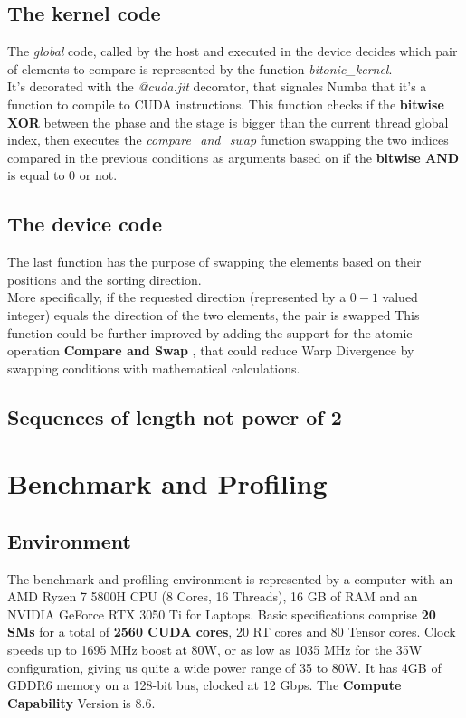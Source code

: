 \documentclass[a4paper, 12pt, oneside]{article}
\begin{document}
\subsection{The kernel code}
The \textit{global} code, called by the host and executed in the device decides which pair of elements to compare is represented by the function \textit{bitonic\_kernel}.\\
It's decorated with the \textit{@cuda.jit} decorator, that signales Numba that it's a function to compile to CUDA instructions.
This function checks if the \textbf{bitwise XOR} between the phase and the stage is bigger than the current thread global index, then executes the \textit{compare\_and\_swap} function swapping the two indices compared in the previous conditions as arguments based on if the \textbf{bitwise AND} is equal to 0 or not.

\subsection{The device code}
The last function has the purpose of swapping the elements based on their positions and the sorting direction.\\
More specifically, if the requested direction (represented by a $0-1$ valued integer) equals the direction of the two elements, the pair is swapped
This function could be further improved by adding the support for the atomic operation \textbf{Compare and Swap} \cite{cas}, that could reduce Warp Divergence by swapping conditions with mathematical calculations.

\subsection{Sequences of length not power of 2}

\section{Benchmark and Profiling}

\subsection{Environment}
The benchmark and profiling environment is represented by a computer with an AMD Ryzen 7 5800H CPU (8 Cores, 16 Threads), 16 GB of RAM and an NVIDIA GeForce RTX 3050 Ti for Laptops.
Basic specifications comprise \textbf{20 SMs} for a total of \textbf{2560 CUDA cores}, 20 RT cores and 80 Tensor cores. Clock speeds up to 1695 MHz boost at 80W, or as low as 1035 MHz for the 35W configuration, giving us quite a wide power range of 35 to 80W.
It has 4GB of GDDR6 memory on a 128-bit bus, clocked at 12 Gbps.
The \textbf{Compute Capability} Version is 8.6.
\end{document}
